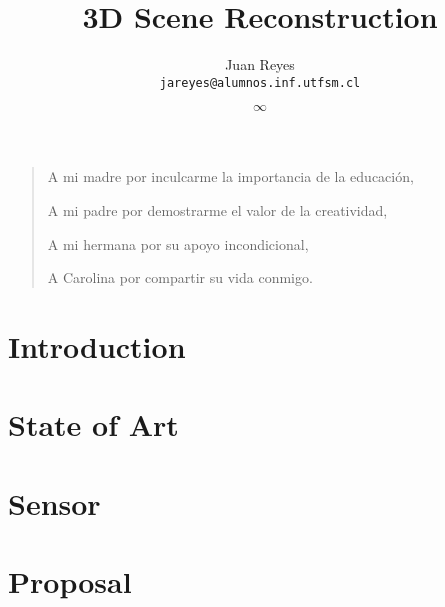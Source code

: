 \documentclass[spanish,english,12pt,letterpaper,oneside]{book}
\title{3D Scene Reconstruction}
\author{
  Juan Reyes \\ \texttt{jareyes@alumnos.inf.utfsm.cl}
}
\date{$\infty$}
\begin{document}
    \newenvironment{dedication}
        {\vspace{6ex}\begin{quotation}\begin{center}\begin{em}}
        {\par\end{em}\end{center}\end{quotation}}

\frontmatter



\begin{dedication}
A mi madre por inculcarme la importancia de la educaci\'on,

A mi padre por demostrarme el valor de la creatividad,

A mi hermana por su apoyo incondicional,

A Carolina por compartir su vida conmigo.
\end{dedication}






\tableofcontents

{}
\listoffigures
{}
\listoftables

\mainmatter

\chapter{Introduction}
\label{introduccion}



\chapter{State of Art}


\chapter{Sensor}


\chapter{Proposal}








\end{document}
